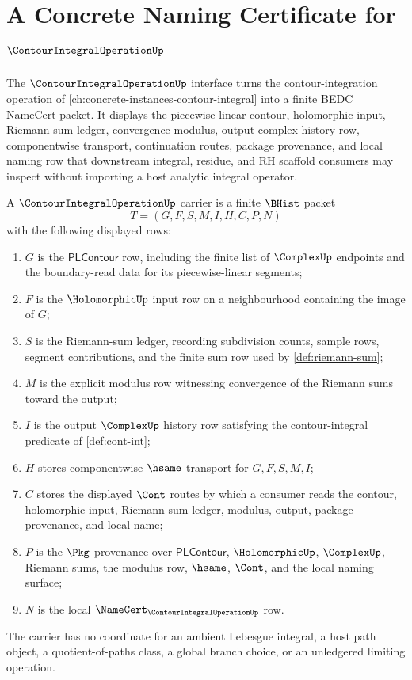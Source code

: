 \chapter{A Concrete Naming Certificate for $\ContourIntegralOperationUp$}
\label{ch:concrete-instances-contourintegraloperation-namecert}

The $\ContourIntegralOperationUp$ interface turns the contour-integration operation of \autoref{ch:concrete-instances-contour-integral} into a finite BEDC NameCert packet. It displays the piecewise-linear contour, holomorphic input, Riemann-sum ledger, convergence modulus, output complex-history row, componentwise transport, continuation routes, package provenance, and local naming row that downstream integral, residue, and RH scaffold consumers may inspect without importing a host analytic integral operator.

\begin{definition}
\label{def:contour-integral-namecert-carrier}
A $\ContourIntegralOperationUp$ carrier is a finite $\BHist$ packet
$$
T=(G,F,S,M,I,H,C,P,N)
$$
with the following displayed rows:
\begin{enumerate}
\item $G$ is the $\mathsf{PLContour}$ row, including the finite list of $\ComplexUp$ endpoints and the boundary-read data for its piecewise-linear segments;
\item $F$ is the $\HolomorphicUp$ input row on a neighbourhood containing the image of $G$;
\item $S$ is the Riemann-sum ledger, recording subdivision counts, sample rows, segment contributions, and the finite sum row used by \autoref{def:riemann-sum};
\item $M$ is the explicit modulus row witnessing convergence of the Riemann sums toward the output;
\item $I$ is the output $\ComplexUp$ history row satisfying the contour-integral predicate of \autoref{def:cont-int};
\item $H$ stores componentwise $\hsame$ transport for $G,F,S,M,I$;
\item $C$ stores the displayed $\Cont$ routes by which a consumer reads the contour, holomorphic input, Riemann-sum ledger, modulus, output, package provenance, and local name;
\item $P$ is the $\Pkg$ provenance over $\mathsf{PLContour}$, $\HolomorphicUp$, $\ComplexUp$, Riemann sums, the modulus row, $\hsame$, $\Cont$, and the local naming surface;
\item $N$ is the local $\NameCert_{\ContourIntegralOperationUp}$ row.
\end{enumerate}
The carrier has no coordinate for an ambient Lebesgue integral, a host path object, a quotient-of-paths class, a global branch choice, or an unledgered limiting operation.
\end{definition}

